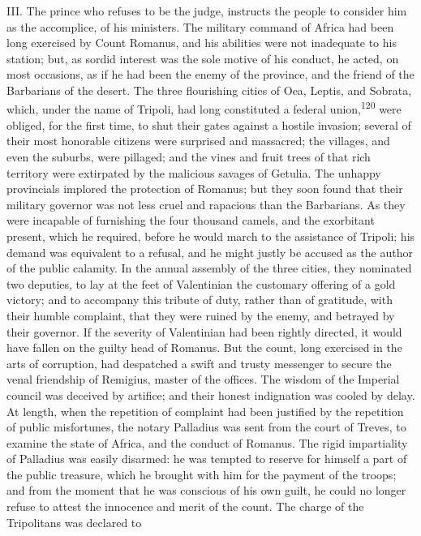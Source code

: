 {{{{{{{{{{{{{{{{{{{{{{{{{{{{{{{{{{{{{{{{{{{{{{{{{{{{{{{{{{{{{{{{{{{{{{{{{{{{{{{{{{{{{{{{{{{{{{{{{{{{{{{{{{{{{{{{{{{{{{{{{{{{{{{{{{III. The prince who refuses to be the judge, instructs the people
to consider him as the accomplice, of his ministers. The military
command of Africa had been long exercised by Count Romanus, and
his abilities were not inadequate to his station; but, as sordid
interest was the sole motive of his conduct, he acted, on most
occasions, as if he had been the enemy of the province, and the
friend of the Barbarians of the desert. The three flourishing
cities of Oea, Leptis, and Sobrata, which, under the name of
Tripoli, had long constituted a federal union,\textsuperscript{120} were obliged,
for the first time, to shut their gates against a hostile
invasion; several of their most honorable citizens were surprised
and massacred; the villages, and even the suburbs, were pillaged;
and the vines and fruit trees of that rich territory were
extirpated by the malicious savages of Getulia. The unhappy
provincials implored the protection of Romanus; but they soon
found that their military governor was not less cruel and
rapacious than the Barbarians. As they were incapable of
furnishing the four thousand camels, and the exorbitant present,
which he required, before he would march to the assistance of
Tripoli; his demand was equivalent to a refusal, and he might
justly be accused as the author of the public calamity. In the
annual assembly of the three cities, they nominated two deputies,
to lay at the feet of Valentinian the customary offering of a
gold victory; and to accompany this tribute of duty, rather than
of gratitude, with their humble complaint, that they were ruined
by the enemy, and betrayed by their governor. If the severity of
Valentinian had been rightly directed, it would have fallen on
the guilty head of Romanus. But the count, long exercised in the
arts of corruption, had despatched a swift and trusty messenger
to secure the venal friendship of Remigius, master of the
offices. The wisdom of the Imperial council was deceived by
artifice; and their honest indignation was cooled by delay. At
length, when the repetition of complaint had been justified by
the repetition of public misfortunes, the notary Palladius was
sent from the court of Treves, to examine the state of Africa,
and the conduct of Romanus. The rigid impartiality of Palladius
was easily disarmed: he was tempted to reserve for himself a part
of the public treasure, which he brought with him for the payment
of the troops; and from the moment that he was conscious of his
own guilt, he could no longer refuse to attest the innocence and
merit of the count. The charge of the Tripolitans was declared to
}}}}}}}}}}}}}}}}}}}}}}}}}}}}}}}}}}}}}}}}}}}}}}}}}}}}}}}}}}}}}}}}}}}}}}}}}}}}}}}}}}}}}}}}}}}}}}}}}}}}}}}}}}}}}}}}}}}}}}}}}}}}}}}}}}
